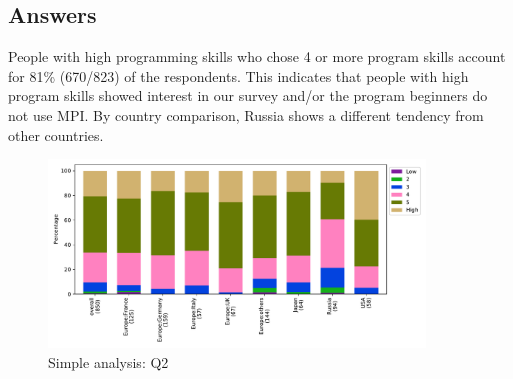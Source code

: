 
\subsection{Answers}


People with high programming skills who chose 4 or more program 
skills account for 81\% (670/823) of the respondents.
This indicates that people with high program skills showed interest
in our survey and/or the program beginners do not use MPI. 
By country comparison, Russia shows a different tendency from 
other countries.

\begin{figure}[htb]
\begin{center}
\includegraphics[width=10cm]{../pdfs/Q2.pdf}
\caption{Simple analysis: Q2}
\label{fig:Q2}
\end{center}
\end{figure}
